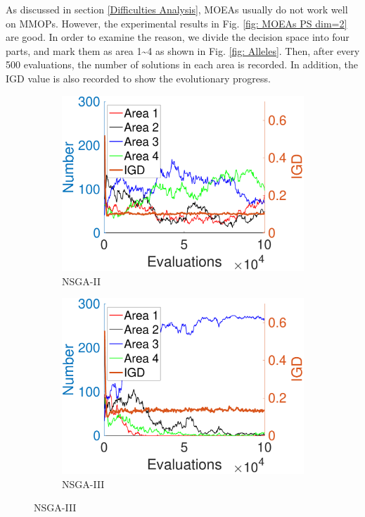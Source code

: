 \documentclass[conference]{IEEEtran}
\begin{document}
As discussed in section \ref{Difficulties Analysis}, MOEAs usually do not work well on MMOPs. However, the experimental results in Fig. \ref{fig: MOEAs PS dim=2} are good. In order to examine the reason, we divide the decision space into four parts, and mark them as area 1\textasciitilde 4  as shown in Fig. \ref{fig: Alleles}. Then, after every 500 evaluations, the number of solutions in each area is recorded. In addition, the IGD value is also recorded to show the evolutionary progress. 

\begin{figure}[htbp]
    \centering
    \begin{subfigure}[b]{.24\textwidth}
    \includegraphics[width=\linewidth]{Section5/dim2/Diversity/NSGAII}
    \caption{NSGA-II}
    \end{subfigure}
    \begin{subfigure}[b]{.24\textwidth}
    \includegraphics[width=\linewidth]{Section5/dim2/Diversity/NSGAIII}
    \caption{NSGA-III}
    \label{fig: NSGA-III Diversity dim=2}
    

\end{subfigure}
\end{figure}
\end{document}
